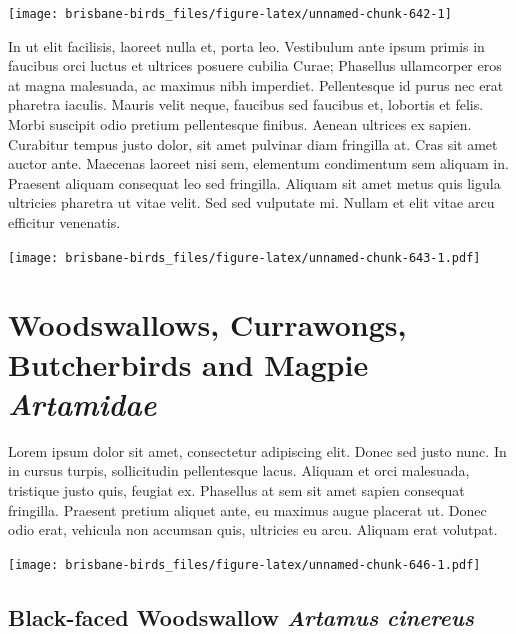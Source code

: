 \documentclass[]{book}
\let\origfigure\figure
\let\endorigfigure\endfigure
\renewenvironment{figure}[1][2] {
  \expandafter\origfigure\expandafter[H]
} {
  \endorigfigure
}
\begin{document}
\begin{figure}
\texttt{[image: brisbane-birds\_files/figure-latex/unnamed-chunk-642-1]} \caption{insert figure caption}\label{fig:unnamed-chunk-642}
\end{figure}

In ut elit facilisis, laoreet nulla et, porta leo. Vestibulum ante ipsum
primis in faucibus orci luctus et ultrices posuere cubilia Curae;
Phasellus ullamcorper eros at magna malesuada, ac maximus nibh
imperdiet. Pellentesque id purus nec erat pharetra iaculis. Mauris velit
neque, faucibus sed faucibus et, lobortis et felis. Morbi suscipit odio
pretium pellentesque finibus. Aenean ultrices ex sapien. Curabitur
tempus justo dolor, sit amet pulvinar diam fringilla at. Cras sit amet
auctor ante. Maecenas laoreet nisi sem, elementum condimentum sem
aliquam in. Praesent aliquam consequat leo sed fringilla. Aliquam sit
amet metus quis ligula ultricies pharetra ut vitae velit. Sed sed
vulputate mi. Nullam et elit vitae arcu efficitur venenatis.

\begin{figure}
\centering
\texttt{[image: brisbane-birds\_files/figure-latex/unnamed-chunk-643-1.pdf]}
\caption{\label{fig:unnamed-chunk-643}insert figure caption}
\end{figure}

\chapter{\texorpdfstring{Woodswallows, Currawongs, Butcherbirds and
Magpie
\emph{Artamidae}}{Woodswallows, Currawongs, Butcherbirds and Magpie Artamidae}}\label{woodswallows-currawongs-butcherbirds-and-magpie-artamidae}

Lorem ipsum dolor sit amet, consectetur adipiscing elit. Donec sed justo
nunc. In in cursus turpis, sollicitudin pellentesque lacus. Aliquam et
orci malesuada, tristique justo quis, feugiat ex. Phasellus at sem sit
amet sapien consequat fringilla. Praesent pretium aliquet ante, eu
maximus augue placerat ut. Donec odio erat, vehicula non accumsan quis,
ultricies eu arcu. Aliquam erat volutpat.

\texttt{[image: brisbane-birds\_files/figure-latex/unnamed-chunk-646-1.pdf]}

\section{\texorpdfstring{Black-faced Woodswallow \emph{Artamus
cinereus}}{Black-faced Woodswallow Artamus cinereus}}\label{black-faced-woodswallow-artamus-cinereus}
\end{document}
